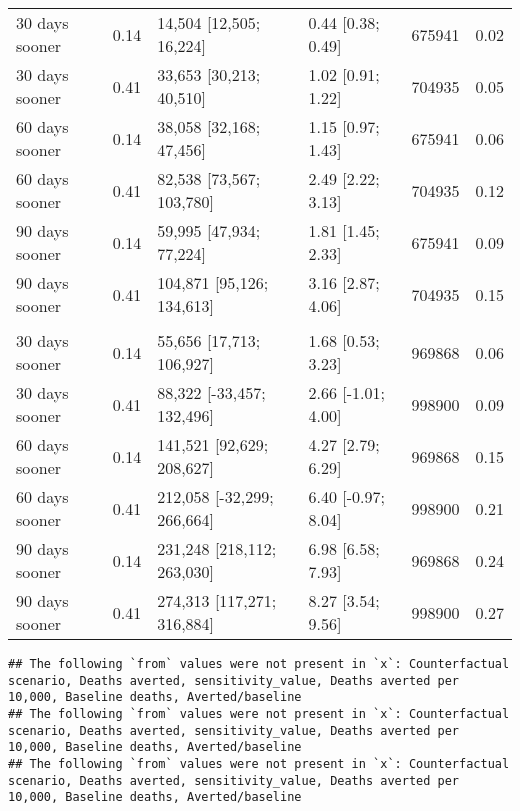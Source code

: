 \documentclass{article}
\begin{document}
\begin{table}
\begin{tabular}[t]{lrllrr}
\hspace{1em}30 days sooner & 0.14 & 14,504 [12,505; 16,224] & 0.44 [0.38; 0.49] & 675941 & 0.02\\
\hspace{1em}30 days sooner & 0.41 & 33,653 [30,213; 40,510] & 1.02 [0.91; 1.22] & 704935 & 0.05\\
\hspace{1em}60 days sooner & 0.14 & 38,058 [32,168; 47,456] & 1.15 [0.97; 1.43] & 675941 & 0.06\\
\hspace{1em}60 days sooner & 0.41 & 82,538 [73,567; 103,780] & 2.49 [2.22; 3.13] & 704935 & 0.12\\
\hspace{1em}90 days sooner & 0.14 & 59,995 [47,934; 77,224] & 1.81 [1.45; 2.33] & 675941 & 0.09\\
\hspace{1em}90 days sooner & 0.41 & 104,871 [95,126; 134,613] & 3.16 [2.87; 4.06] & 704935 & 0.15\\
\addlinespace[0.3em]
\multicolumn{6}{l}{\textbf{US to Jan 2022}}\\
\hspace{1em}30 days sooner & 0.14 & 55,656 [17,713; 106,927] & 1.68 [0.53; 3.23] & 969868 & 0.06\\
\hspace{1em}30 days sooner & 0.41 & 88,322 [-33,457; 132,496] & 2.66 [-1.01; 4.00] & 998900 & 0.09\\
\hspace{1em}60 days sooner & 0.14 & 141,521 [92,629; 208,627] & 4.27 [2.79; 6.29] & 969868 & 0.15\\
\hspace{1em}60 days sooner & 0.41 & 212,058 [-32,299; 266,664] & 6.40 [-0.97; 8.04] & 998900 & 0.21\\
\hspace{1em}90 days sooner & 0.14 & 231,248 [218,112; 263,030] & 6.98 [6.58; 7.93] & 969868 & 0.24\\
\hspace{1em}90 days sooner & 0.41 & 274,313 [117,271; 316,884] & 8.27 [3.54; 9.56] & 998900 & 0.27\\
\bottomrule
\end{tabular}
\end{table}

\begin{verbatim}
## The following `from` values were not present in `x`: Counterfactual scenario, Deaths averted, sensitivity_value, Deaths averted per 10,000, Baseline deaths, Averted/baseline
## The following `from` values were not present in `x`: Counterfactual scenario, Deaths averted, sensitivity_value, Deaths averted per 10,000, Baseline deaths, Averted/baseline
## The following `from` values were not present in `x`: Counterfactual scenario, Deaths averted, sensitivity_value, Deaths averted per 10,000, Baseline deaths, Averted/baseline
\end{verbatim}
\end{document}

